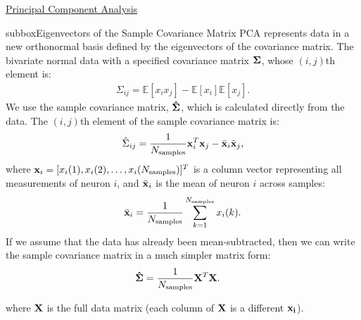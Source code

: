 \begin{textbox}{\href{https://compneuro.neuromatch.io/tutorials/W1D4_DimensionalityReduction/student/W1D4_Tutorial2.html}{Principal Component Analysis } }
\begin{subbox}{subbox}{Eigenvectors of the Sample Covariance Matrix}
\scriptsize
PCA represents data in a new orthonormal basis defined by the eigenvectors of the covariance matrix. The bivariate normal data with a specified covariance matrix $\bf \Sigma$, whose $(i,j)$th element is:
\begin{align}
\Sigma_{ij} = \mathbb{E}[ x_i x_j ] - \mathbb{E}[ x_i] \mathbb{E}[ x_j ] .
\end{align}
 We use the sample covariance matrix, $\bf\hat\Sigma$, which is calculated directly from the data. The $(i,j)$th element of the sample covariance matrix is:
\begin{align}
 \hat \Sigma_{ij} =  \frac{1}{N_\text{samples}}{\bf x}_i^T {\bf x}_j - \bar {\bf x}_i \bar{\bf x}_j ,
\end{align}
where ${\bf x}_i = [ x_i(1), x_i(2), \dots,x_i(N_\text{samples})]^T$ is a column vector representing all measurements of neuron $i$, and  $\bar {\bf x}_i$ is the mean of neuron $i$ across samples:
\begin{align}
\bar {\bf x}_i = \frac{1}{N_\text{samples}} \sum_{k=1}^{N_\text{samples}} x_i(k).
\end{align}
If we assume that the data has already been mean-subtracted, then we can write the sample covariance matrix in a much simpler matrix form:
\begin{align}
{\bf \hat \Sigma}
&= \frac{1}{N_\text{samples}} {\bf X}^T {\bf X}.
\end{align}

where $\bf X$ is the full data matrix (each column of $\bf X$ is a different $\bf x_i$). 
\end{subbox}

\end{textbox}
